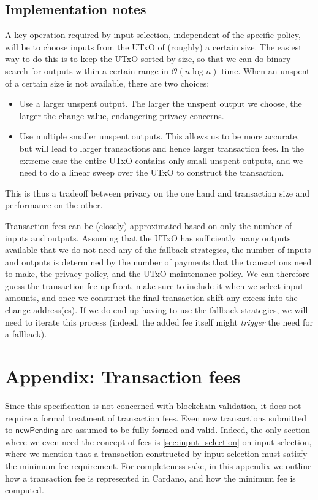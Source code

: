 \documentclass{article}
\newcommand{\order}[1]{\mathcal{O}\left(#1\right)}
\theoremstyle{definition}{
  \newtheorem{lemma}{Lemma}[section] %
  \newtheorem{definition}[lemma]{Definition}
}
\theoremstyle{theorem}{
  \newtheorem{invariant}[lemma]{Invariant}
  \newtheorem{proofobligation}[lemma]{Proof Obligation}
}
\numberwithin{equation}{lemma}
\begin{document}
\subsection{Implementation notes}

A key operation required by input selection, independent of the specific policy,
will be to choose inputs from the UTxO of (roughly) a certain size. The easiest
way to do this is to keep the UTxO sorted by size, so that we can do binary
search for outputs within a certain range in $\order{n \log n}$ time. When an
unspent of a certain size is not available, there are two choices:
%
\begin{itemize}
\item Use a larger unspent output. The larger the unspent output we choose,
the larger the change value, endangering privacy concerns.
\item Use multiple smaller unspent outputs. This allows us to be more
accurate, but will lead to larger transactions and hence larger transaction
fees. In the extreme case the entire UTxO contains only small unspent outputs,
and we need to do a linear sweep over the UTxO to construct the transaction.
\end{itemize}
%
This is thus a tradeoff between privacy on the one hand and transaction size
and performance on the other.

Transaction fees can be (closely) approximated based on only the number of
inputs and outputs. Assuming that the UTxO has sufficiently many outputs
available that we do not need any of the fallback strategies, the number of
inputs and outputs is determined by the number of payments that the transactions
need to make, the privacy policy, and the UTxO maintenance policy. We can
therefore guess the transaction fee up-front, make sure to include it when we
select input amounts, and once we construct the final transaction shift any
excess into the change address(es).  If we do end up having to use the fallback
strategies, we will need to iterate this process (indeed, the added fee itself
might \emph{trigger} the need for a fallback).

\appendix

\section{Appendix: Transaction fees}
\label{app:transaction_fees}

Since this specification is not concerned with blockchain validation, it does
not require a formal treatment of transaction fees. Even new transactions
submitted to $\mathsf{newPending}$ are assumed to be fully formed and valid.
Indeed, the only section where we even need the concept of fees is
\cref{sec:input_selection} on input selection, where we mention that a
transaction constructed by input selection must satisfy the minimum fee
requirement. For completeness sake, in this appendix we outline how a
transaction fee is represented in Cardano, and how the minimum fee is computed.
\end{document}
